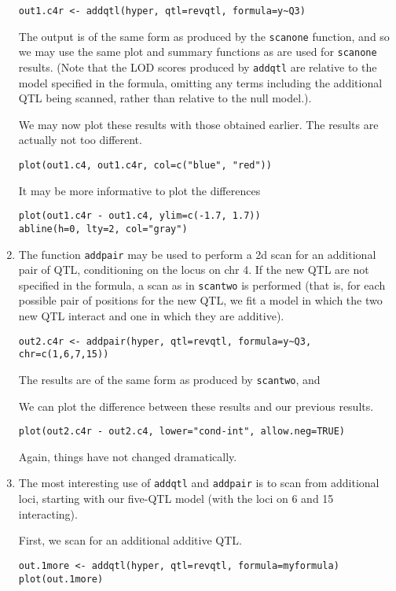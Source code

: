 \documentclass[10pt,letterpaper]{article}
\newcommand{\usercolor}{\color [named]{BlueViolet}}
\begin{document}
\begin{enumerate}
\usercolor
\verb|out1.c4r <- addqtl(hyper, qtl=revqtl, formula=y~Q3)|
\normalcolor

The output is of the same form as produced by the \verb-scanone-
function, and so we may use the same plot and summary functions as are
used for \verb-scanone- results.  (Note that the LOD scores produced
by \verb-addqtl- are relative to the model specified in the formula,
omitting any terms including the additional QTL being scanned, rather
than relative to the null model.).

We may now plot these results with those obtained earlier.  The
results are actually not too different. 

\usercolor
\verb|plot(out1.c4, out1.c4r, col=c("blue", "red"))| 
\normalcolor

It may be more informative to plot the differences

\usercolor
\verb|plot(out1.c4r - out1.c4, ylim=c(-1.7, 1.7))| \\
\verb|abline(h=0, lty=2, col="gray")|
\normalcolor

\item The function \verb-addpair- may be used to perform a 2d scan for
  an additional pair of QTL, conditioning on the locus on chr 4.  If
  the new QTL are not specified in the formula, a scan as in
  \verb-scantwo- is performed (that is, for each possible pair of
  positions for the new QTL, we fit a model in which the two new QTL
  interact and one in which they are additive).

\usercolor
\verb|out2.c4r <- addpair(hyper, qtl=revqtl, formula=y~Q3, chr=c(1,6,7,15))|
\normalcolor

The results are of the same form as produced by \verb-scantwo-, and

We can plot the difference between these results and our previous
results.

\usercolor
\verb|plot(out2.c4r - out2.c4, lower="cond-int", allow.neg=TRUE)|
\normalcolor

Again, things have not changed dramatically.

\item The most interesting use of \verb-addqtl- and \verb-addpair- is
  to scan from additional loci, starting with our five-QTL model (with
  the loci on 6 and 15 interacting).

  First, we scan for an additional additive QTL.

\usercolor
\verb|out.1more <- addqtl(hyper, qtl=revqtl, formula=myformula)| \\
\verb|plot(out.1more)| 
\normalcolor


\end{enumerate}
\end{document}
